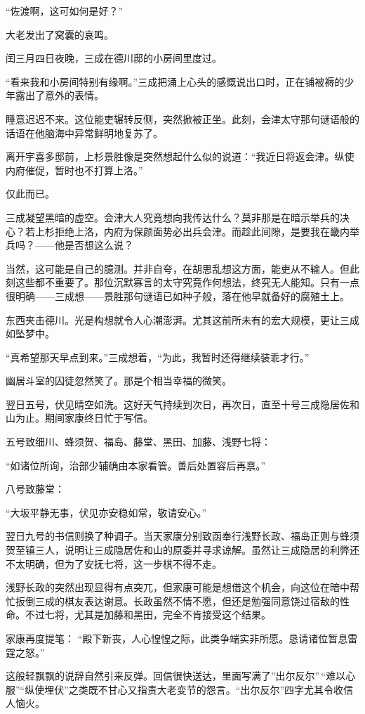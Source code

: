 \documentclass[
]{book}
\begin{document}
``佐渡啊，这可如何是好？''

大老发出了窝囊的哀鸣。

闰三月四日夜晚，三成在德川邸的小房间里度过。

``看来我和小房间特别有缘啊。''三成把涌上心头的感慨说出口时，正在铺被褥的少年露出了意外的表情。

睡意迟迟不来。这位能吏辗转反侧，突然掀被正坐。此刻，会津太守那句谜语般的话语在他脑海中异常鲜明地复苏了。

离开宇喜多邸前，上杉景胜像是突然想起什么似的说道：``我近日将返会津。纵使内府催促，暂时也不打算上洛。''

仅此而已。

三成凝望黑暗的虚空。会津大人究竟想向我传达什么？莫非那是在暗示举兵的决心？若上杉拒绝上洛，内府为保颜面势必出兵会津。而趁此间隙，是要我在畿内举兵吗？------他是否想这么说？

当然，这可能是自己的臆测。并非自夸，在胡思乱想这方面，能吏从不输人。但此刻这些都不重要了。那位沉默寡言的太守究竟作何想法，终究无人能知。只有一点很明确------三成想------景胜那句谜语已如种子般，落在他早就备好的腐殖土上。

东西夹击德川。光是构想就令人心潮澎湃。尤其这前所未有的宏大规模，更让三成如坠梦中。

``真希望那天早点到来。''三成想着，``为此，我暂时还得继续装乖才行。''

幽居斗室的囚徒忽然笑了。那是个相当幸福的微笑。

翌日五号，伏见晴空如洗。这好天气持续到次日，再次日，直至十号三成隐居佐和山为止。期间家康终日忙于写信。

五号致细川、蜂须贺、福岛、藤堂、黑田、加藤、浅野七将：

``如诸位所询，治部少辅确由本家看管。善后处置容后再禀。''

八号致藤堂：

``大坂平静无事，伏见亦安稳如常，敬请安心。''

翌日九号的书信则换了种调子。当天家康分别致函奉行浅野长政、福岛正则与蜂须贺至镇三人，说明让三成隐居佐和山的原委并寻求谅解。虽然让三成隐居的利弊还不太明确，但为了安抚七将，这一步棋不得不走。

浅野长政的突然出现显得有点突兀，但家康可能是想借这个机会，向这位在暗中帮忙扳倒三成的棋友表达谢意。长政虽然不情不愿，但还是勉强同意饶过宿敌的性命。不过七将，尤其是加藤和黑田，完全不肯接受这个结果。

家康再度提笔：
``殿下新丧，人心惶惶之际，此类争端实非所愿。恳请诸位暂息雷霆之怒。''

这般轻飘飘的说辞自然引来反弹。回信很快送达，里面写满了''出尔反尔''\,``难以心服''``纵使埋伏''之类既不甘心又指责大老变节的怨言。``出尔反尔''四字尤其令收信人恼火。
\end{document}
